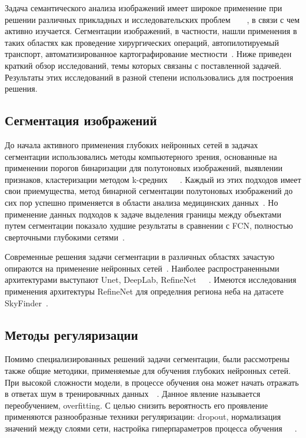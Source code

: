Задача семантического анализа изображений имеет широкое применение при решении различных прикладных и исследовательских
проблем~\autocite{maier2018gentle}~\autocite{pan2019image}~\autocite{stabinger2020evaluating}~\autocite{li2015brief},
в связи с чем активно изучается.
Сегментации изображений, в частности, нашли применения в таких областях как проведение хирургических операций,
автопилотируемый транспорт, автоматизированное картографирование местности~\autocite{liu2018recent}.
Ниже приведен краткий обзор исследований, темы которых связаны с поставленной задачей.
Результаты этих исследований в разной степени использовались для построения решения.

\subsection{Сегментация изображений}

До начала активного применения глубоких нейронных сетей в задачах сегментации использовались методы компьютерного зрения,
основанные на применении порогов бинаризации для полутоновых изображений, выявлении признаков,
кластеризации методом k-средних~\autocite{10.5555/1888028.1888043}~\autocite{10.5555/540298}~\autocite{inproceedings}.
Каждый из этих подходов имеет свои приемущества, метод бинарной сегментации полутоновых изображений до сих пор успешно применяется
в области анализа медицинских данных~\autocite{bookMedicalImages}.
Но применение данных подходов к задаче выделения границы между объектами путем сегментации показало худшие результаты в сравнении с FCN,
полностью сверточными глубокими сетями~\autocite{7966418}.

Современные решения задачи сегментации в различных областях зачастую опираются на применение нейронных сетей~\autocite{feng2019deep}.
Наиболее распространенными архитектурами выступают Unet, DeepLab, RefineNet~\autocite{ronneberger2015unet}~\autocite{chen2016deeplab}~\autocite{lin2016refinenet}.
Имеются исследования применения архитектуры RefineNet для определния региона неба на датасете SkyFinder~\autocite{place2017segmenting}.

\subsection{Методы регуляризации}

Помимо специализированных решений задачи сегментации, были рассмотрены также общие методики, применяемые для обучения глубоких нейронных сетей.
При высокой сложности модели, в процессе обучения она может начать отражать в ответах шум в тренировачных данных~\autocite{salman2019overfitting}~\autocite{ghojogh2019theory}.
Данное явление называется переобучением, overfitting.
С целью снизить вероятность его проявление применяются разнообразные техники регуляризации: dropout, нормализация значений между слоями сети,
настройка гиперпараметров процесса обучения~\autocite{smith2018disciplined}~\autocite{labach2019survey}~\autocite{ioffe2015batch}.

